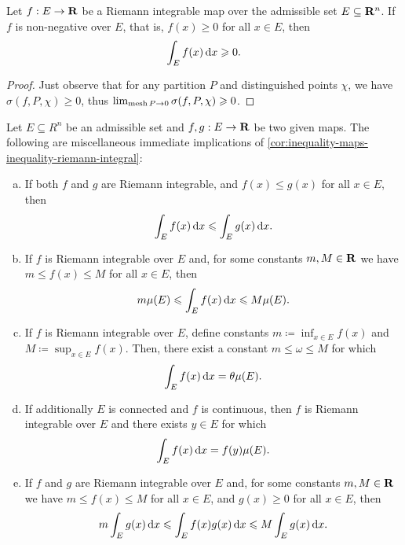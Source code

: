 \begin{proposition}
\label{prop:non-negative-real-valued-integral-non-negative}
Let \(f: E \to \mathbf{R}\) be a Riemann integrable map over the admissible set \(E
\subseteq \mathbf{R}^{n}\). If \(f\) is non-negative over \(E\), that is, \(f(x) \geq
0\) for all \(x \in E\), then
\[
  \int_E f(x)\, \mathrm{d} x \geqslant 0.
\]
\end{proposition}

\begin{proof}
Just observe that for any partition \(P\) and distinguished points \(\chi\), we
have \(\sigma(f, P, \chi) \geq 0\), thus \(\lim_{\operatorname{mesh} P \to 0} \sigma(f, P,
\chi) \geqslant 0\).
\end{proof}

\begin{corollary}
\label{cor:inequality-maps-inequality-riemann-integral}
Let \(E \subseteq R^n\) be an admissible set and \(f, g: E \to \mathbf{R}\) be two given
maps. The following are miscellaneous immediate implications of
\cref{cor:inequality-maps-inequality-riemann-integral}:
\begin{enumerate}[(a)]\setlength\itemsep{0em}
\item If both \(f\) and \(g\) are Riemann integrable, and \(f(x) \leq g(x)\) for
  all \(x \in E\), then
  \[
    \int_E f(x)\, \mathrm{d} x \leqslant \int_E g(x)\, \mathrm{d} x.
  \]

\item If \(f\) is Riemann integrable over \(E\) and, for some constants \(m, M
  \in \mathbf{R}\) we have \(m \leq f(x) \leq M\) for all \(x \in E\), then
  \[
    m \mu(E) \leqslant \int_E f(x)\, \mathrm{d} x \leqslant M \mu(E).
  \]

\item If \(f\) is Riemann integrable over \(E\), define constants \(m
  \coloneq \inf_{x \in E} f(x)\) and \(M \coloneq \sup_{x \in E} f(x)\). Then,
  there exist a constant \(m \leq \omega \leq M\) for which
  \[
    \int_E f(x)\, \mathrm{d} x = \theta \mu(E).
  \]

\item If additionally \(E\) is connected and \(f\) is continuous, then \(f\) is
  Riemann integrable over \(E\) and there exists \(y \in E\) for which
  \[
    \int_E f(x)\, \mathrm{d} x = f(y) \mu(E).
  \]

\item If \(f\) and \(g\) are Riemann integrable over \(E\) and, for some
  constants \(m, M \in \mathbf{R}\) we have \(m \leq f(x) \leq M\) for all \(x \in E\),
  and \(g(x) \geq 0\) for all \(x \in E\), then
  \[
    m \int_E g(x)\, \mathrm{d} x \leqslant \int_E f(x) g(x)\, \mathrm{d} x
    \leqslant M \int_E g(x)\, \mathrm{d} x.
  \]
\end{enumerate}
\end{corollary}

